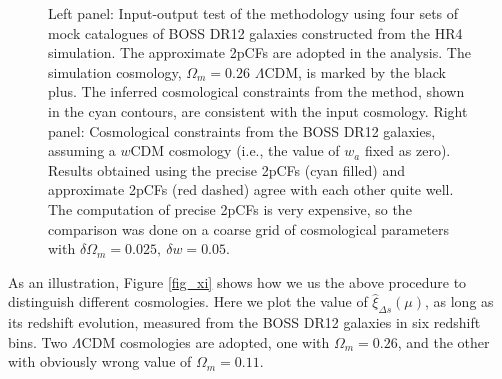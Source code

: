 \documentclass[iop]{emulateapj}
\begin{document}
\begin{figure}
   \caption{\label{fig_Check}
 Left panel: Input-output test of the methodology using four sets of mock catalogues of BOSS DR12 galaxies constructed from the HR4 simulation.
 The approximate 2pCFs are adopted in the analysis.
 The simulation cosmology, $\Omega_m=0.26$ $\Lambda$CDM, is marked by the black plus.
 The inferred cosmological constraints from the method, shown in the cyan contours, are consistent with the input cosmology.
 Right panel: Cosmological constraints from the BOSS DR12 galaxies, assuming a $w$CDM cosmology 
 (i.e., the value of $w_a$ fixed as zero).
 Results obtained using the precise 2pCFs (cyan filled) 
 and approximate 2pCFs (red dashed) agree with each other quite well.
 The computation of precise 2pCFs is very expensive,
 so the comparison was done on a coarse grid of cosmological parameters with $\delta \Omega_m=0.025,\ \delta w=0.05$.
   }
\end{figure}

As an illustration,
Figure \ref{fig_xi} shows how we us the above procedure to distinguish different cosmologies.
Here we plot the value of $\hat\xi_{\Delta s}(\mu)$, as long as its redshift evolution, 
measured from the BOSS DR12 galaxies in six redshift bins.
Two $\Lambda$CDM cosmologies are adopted, 
one with $\Omega_m=0.26$, and the other with obviously wrong value of $\Omega_m=0.11$.
\end{document}
